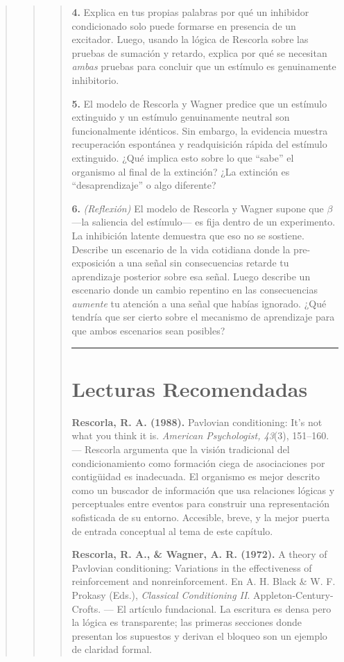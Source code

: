 \documentclass[
  letterpaper,
  DIV=11,
  numbers=noendperiod]{scrreprt}
\begin{document}
\begin{tcolorbox}[enhanced jigsaw, arc=.35mm, bottomrule=.15mm, breakable, colback=white, colframe=quarto-callout-note-color-frame, left=2mm, leftrule=.75mm, opacityback=0, rightrule=.15mm, toprule=.15mm]
\begin{quote}
\begin{quote}
\begin{quote}
\textbf{4.} Explica en tus propias palabras por qué un inhibidor
condicionado solo puede formarse en presencia de un excitador. Luego,
usando la lógica de Rescorla sobre las pruebas de sumación y retardo,
explica por qué se necesitan \emph{ambas} pruebas para concluir que un
estímulo es genuinamente inhibitorio.

\textbf{5.} El modelo de Rescorla y Wagner predice que un estímulo
extinguido y un estímulo genuinamente neutral son funcionalmente
idénticos. Sin embargo, la evidencia muestra recuperación espontánea y
readquisición rápida del estímulo extinguido. ¿Qué implica esto sobre lo
que ``sabe'' el organismo al final de la extinción? ¿La extinción es
``desaprendizaje'' o algo diferente?

\textbf{6.} \emph{(Reflexión)} El modelo de Rescorla y Wagner supone que
\(\beta\) ---la saliencia del estímulo--- es fija dentro de un
experimento. La inhibición latente demuestra que eso no se sostiene.
Describe un escenario de la vida cotidiana donde la pre-exposición a una
señal sin consecuencias retarde tu aprendizaje posterior sobre esa
señal. Luego describe un escenario donde un cambio repentino en las
consecuencias \emph{aumente} tu atención a una señal que habías
ignorado. ¿Qué tendría que ser cierto sobre el mecanismo de aprendizaje
para que ambos escenarios sean posibles?

\begin{center}\rule{0.5\linewidth}{0.5pt}\end{center}

\mbox{}%
\section{Lecturas Recomendadas}\label{lecturas-recomendadas-3}

\textbf{Rescorla, R. A. (1988).} Pavlovian conditioning: It's not what
you think it is. \emph{American Psychologist, 43}(3), 151--160. ---
Rescorla argumenta que la visión tradicional del condicionamiento como
formación ciega de asociaciones por contigüidad es inadecuada. El
organismo es mejor descrito como un buscador de información que usa
relaciones lógicas y perceptuales entre eventos para construir una
representación sofisticada de su entorno. Accesible, breve, y la mejor
puerta de entrada conceptual al tema de este capítulo.

\textbf{Rescorla, R. A., \& Wagner, A. R. (1972).} A theory of Pavlovian
conditioning: Variations in the effectiveness of reinforcement and
nonreinforcement. En A. H. Black \& W. F. Prokasy (Eds.),
\emph{Classical Conditioning II}. Appleton-Century-Crofts. --- El
artículo fundacional. La escritura es densa pero la lógica es
transparente; las primeras secciones donde presentan los supuestos y
derivan el bloqueo son un ejemplo de claridad formal.


\end{quote}
\end{quote}
\end{quote}
\end{tcolorbox}
\end{document}
